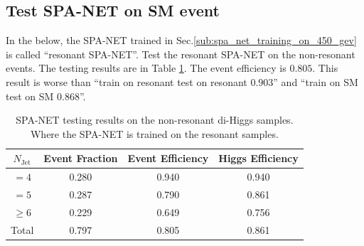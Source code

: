 \documentclass[12pt]{article}
\begin{document}
	\subsection{Test SPA-NET on SM event}%
	\label{sub:test_spa_net_on_sm_event}
		In the below, the SPA-NET trained in Sec.\ref{sub:spa_net_training_on_450_gev} is called ``resonant SPA-NET''. Test the resonant SPA-NET on the non-resonant events. The testing results are in Table \ref{tab:SPANet_train_450GeV_test_SM}. The event efficiency is $0.805$. This result is worse than ``train on resonant test on resonant $0.903$'' and ``train on SM test on SM $0.868$''.
		\begin{table}[htpb]
			\centering
			\caption{SPA-NET testing results on the non-resonant di-Higgs samples. Where the SPA-NET is trained on the resonant samples.}
			\label{tab:SPANet_train_450GeV_test_SM}
			\begin{tabular}{c|c|cc}
				$N_\text{Jet}$ & Event Fraction & Event Efficiency & Higgs Efficiency \\
				\hline
				$=4$	  &   0.280             &    0.940              &    0.940             \\
				$=5$	  &   0.287             &    0.790              &    0.861             \\
				$\ge 6$	  &   0.229             &    0.649              &    0.756             \\
				Total	  &   0.797             &    0.805              &    0.861             \\
			\end{tabular}
		\end{table}
\end{document}

